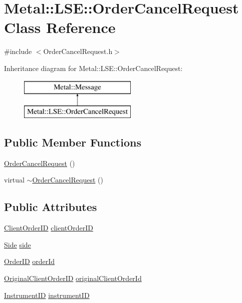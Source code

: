 \hypertarget{classMetal_1_1LSE_1_1OrderCancelRequest}{}\section{Metal\+:\+:L\+S\+E\+:\+:Order\+Cancel\+Request Class Reference}
\label{classMetal_1_1LSE_1_1OrderCancelRequest}


{\ttfamily \#include $<$Order\+Cancel\+Request.\+h$>$}

Inheritance diagram for Metal\+:\+:L\+S\+E\+:\+:Order\+Cancel\+Request\+:\begin{figure}[H]
\begin{center}
\leavevmode
\includegraphics[height=2.000000cm]{classMetal_1_1LSE_1_1OrderCancelRequest}
\end{center}
\end{figure}
\subsection*{Public Member Functions}
\begin{DoxyCompactItemize}
\item 
\hyperlink{classMetal_1_1LSE_1_1OrderCancelRequest_a7334bf6b9c759c5d9c493fba0507111d}{Order\+Cancel\+Request} ()
\item 
virtual \hyperlink{classMetal_1_1LSE_1_1OrderCancelRequest_ada763ff79958a669d9255d8eb2028b60}{$\sim$\+Order\+Cancel\+Request} ()
\end{DoxyCompactItemize}
\subsection*{Public Attributes}
\begin{DoxyCompactItemize}
\item 
\hyperlink{namespaceMetal_1_1LSE_a7f5f027430e2d08dcf1a5ccba4ea7bc6}{Client\+Order\+I\+D} \hyperlink{classMetal_1_1LSE_1_1OrderCancelRequest_a17cf42a99f70826442cd78668a20e460}{client\+Order\+I\+D}
\item 
\hyperlink{namespaceMetal_1_1LSE_af5236b7a999484d8cd5b579b7d7c133b}{Side} \hyperlink{classMetal_1_1LSE_1_1OrderCancelRequest_a8147911f2234bdb988adfb6f43b7aaca}{side}
\item 
\hyperlink{namespaceMetal_1_1LSE_a30b8c9f132779cac1a35919835725059}{Order\+I\+D} \hyperlink{classMetal_1_1LSE_1_1OrderCancelRequest_ad35bf5f0e86e582724e8e6868028b976}{order\+Id}
\item 
\hyperlink{namespaceMetal_1_1LSE_a28d9de72a77b3eab8551831696a678c1}{Original\+Client\+Order\+I\+D} \hyperlink{classMetal_1_1LSE_1_1OrderCancelRequest_a96b6730c82337371d5de0354566a616c}{original\+Client\+Order\+Id}
\item 
\hyperlink{namespaceMetal_1_1LSE_a5280aa41aaa4433df351e733a23ecd14}{Instrument\+I\+D} \hyperlink{classMetal_1_1LSE_1_1OrderCancelRequest_a25a35022d18a4c0826199bbb6950ad16}{instrument\+I\+D}
\end{DoxyCompactItemize}

